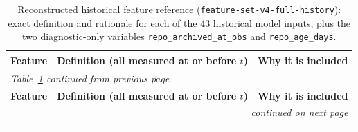 {\footnotesize
\setlength{\tabcolsep}{4pt}
\begin{longtable}{p{} p{} p{}}
\caption[Historical feature reference]{Reconstructed historical feature reference
(\texttt{feature-set-v4-full-history}): exact definition and rationale for each
of the 43 historical model inputs, plus the two diagnostic-only variables
\texttt{repo\_archived\_at\_obs} and \texttt{repo\_age\_days}.}
\label{tab:method-feature-reference} \\
\hline
\textbf{Feature} & \textbf{Definition (all measured at or before \(t\))} & \textbf{Why it is included} \\
\hline
\endfirsthead
\multicolumn{3}{l}{\small\itshape Table~\ref{tab:method-feature-reference} continued from previous page} \\
\hline
\textbf{Feature} & \textbf{Definition (all measured at or before \(t\))} & \textbf{Why it is included} \\
\hline
\endhead
\hline
\multicolumn{3}{r}{\small\itshape continued on next page} \\
\endfoot
\hline
\endlastfoot


\end{longtable}}
